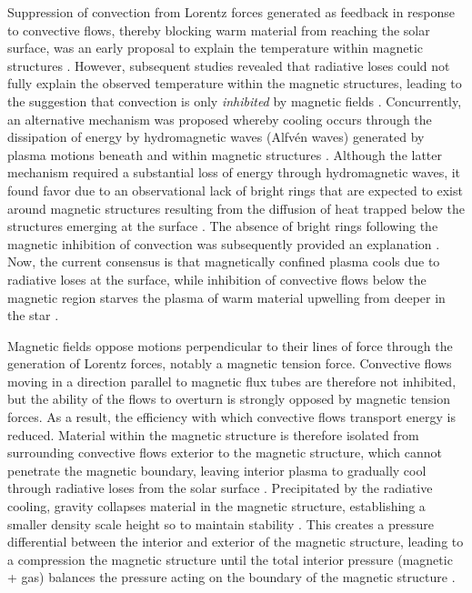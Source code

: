 Suppression of convection from Lorentz forces generated as feedback in response to convective flows, thereby blocking warm material from reaching the solar surface, was an early proposal to explain the temperature within magnetic structures \citep{Biermann1941}. However, subsequent studies revealed that radiative loses could not fully explain the observed temperature within the magnetic structures, leading to the suggestion that convection is only \emph{inhibited} by magnetic fields \citep{Deinzer1965}. Concurrently, an alternative mechanism was proposed whereby cooling occurs through the dissipation of energy by hydromagnetic waves (Alfv\'{e}n waves) generated by plasma motions beneath and within magnetic structures \citep{Alfven1942,Parker1974b}. Although the latter mechanism required a substantial loss of energy through hydromagnetic waves, it found favor due to an observational lack of bright rings that are expected to exist around magnetic structures resulting from the diffusion of heat trapped below the structures emerging at the surface \citep{Parker1974b}. The absence of bright rings following the magnetic inhibition of convection was subsequently provided an explanation \citep{Spruit1977,Spruit1982a}. Now, the current consensus is that magnetically confined plasma cools due to radiative loses at the surface, while inhibition of convective flows below the magnetic region starves the plasma of warm material upwelling from deeper in the star \citep[see, e.g., reviews by][]{Rempel2011,Stein2012}.  

Magnetic fields oppose motions perpendicular to their lines of force through the generation of Lorentz forces, notably a magnetic tension force. Convective flows moving in a direction parallel to magnetic flux tubes are therefore not inhibited, but the ability of the flows to overturn is strongly opposed by magnetic tension forces. As a result, the efficiency with which convective flows transport energy is reduced. Material within the magnetic structure is therefore isolated from surrounding convective flows exterior to the magnetic structure, which cannot penetrate the magnetic boundary, leaving interior plasma to gradually cool through radiative loses from the solar surface \citep{Stein2012}. Precipitated by the radiative cooling, gravity collapses material in the magnetic structure, establishing a smaller density scale height so to maintain stability \citep{Parker1978}. This creates a pressure differential between the interior and exterior of the magnetic structure, leading to a compression the magnetic structure until the total interior pressure (magnetic + gas) balances the pressure acting on the boundary of the magnetic structure \citep{Parker1978,Spruit1979}.

